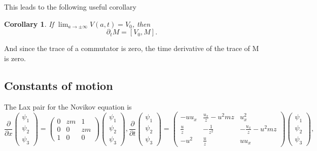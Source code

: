 \documentclass[english,master]{liumaiex}
\theoremstyle{plain}
\newtheorem{corollary}[proposition]{Corollary}
\theoremstyle{definition}
\begin{document}
This leads to the following useful corollary
\begin{corollary} \label{cor:Monodromy}
	If $\lim_{a \rightarrow \pm \infty} V(a,t) = V_0$, then
	\begin{equation}
		\partial_t M = [V_0, M].
	\end{equation}
\end{corollary}
And since the trace of a commutator is zero, the time derivative of the trace of M is zero.

\subsection{Constants of motion}

The Lax pair for the Novikov equation \cite{Lundmark_2022} is
\begin{subequations}
  \label{eq:Novikov-lax}
  \begin{equation}
    \label{eq:Novikov-lax-x}
    \frac{\partial}{\partial x}
    \begin{pmatrix} \psi_1 \\ \psi_2 \\ \psi_3 \end{pmatrix} =
    \begin{pmatrix}
      0 & zm & 1 \\
      0 & 0 & zm \\
      1 & 0 & 0
    \end{pmatrix}
    \begin{pmatrix} \psi_1 \\ \psi_2 \\ \psi_3 \end{pmatrix}
    ,
  \end{equation}
  \begin{equation}
    \label{eq:Novikov-lax-t}
    \frac{\partial}{\partial t}
    \begin{pmatrix} \psi_1 \\ \psi_2 \\ \psi_3 \end{pmatrix} =
    \begin{pmatrix}
      -u u_x & \frac{u_x}{z}-u^2 mz & u_x^2 \\
      \frac{u}{z} & - \frac{1}{z^2} & - \frac{u_x}{z} - u^2 mz \\
      -u^2 & \frac{u}{z} & uu_x
    \end{pmatrix}
    \begin{pmatrix} \psi_1 \\ \psi_2 \\ \psi_3 \end{pmatrix}
    ,
  \end{equation}
\end{subequations}
\end{document}
